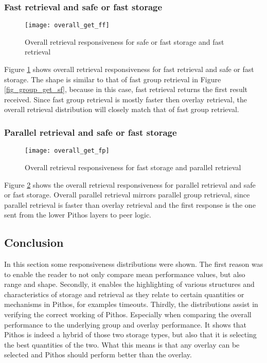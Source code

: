 \subsubsection{Fast retrieval and safe or fast storage}
\begin{figure}[htbp]
 \centering
 \texttt{[image: overall\_get\_ff]}
 \caption{Overall retrieval responsiveness for safe or fast storage and fast retrieval}
 \label{fig_overall_get_ff}
\end{figure}
%
Figure \ref{fig_overall_get_ff} shows overall retrieval responsiveness for fast retrieval and safe or fast storage. The shape is similar to that of fast group retrieval in Figure \ref{fig_group_get_sf}, because in this case, fast retrieval returns the first result received. Since fast group retrieval is mostly faster then overlay retrieval, the overall retrieval distribution will closely match that of fast group retrieval.

\subsubsection{Parallel retrieval and safe or fast storage}
\begin{figure}[htbp]
 \centering
 \texttt{[image: overall\_get\_fp]}
 \caption{Overall retrieval responsiveness for fast storage and parallel retrieval}
 \label{fig_overall_get_fp}
\end{figure}
%
Figure \ref{fig_overall_get_fp} shows the overall retrieval responsiveness for parallel retrieval and safe or fast storage. Overall parallel retrieval mirrors parallel group retrieval, since parallel retrieval is faster than overlay retrieval and the first response is the one sent from the lower Pithos layers to peer logic.

\subsection{Conclusion}

In this section some responsiveness distributions were shown. The first reason was to enable the reader to not only compare mean performance values, but also range and shape. Secondly, it enables the highlighting of various structures and characteristics of storage and retrieval as they relate to certain quantities or mechanisms in Pithos, for examples timeouts. Thirdly, the distributions assist in verifying the correct working of Pithos. Especially when comparing the overall performance to the underlying group and overlay performance. It shows that Pithos is indeed a hybrid of those two storage types, but also that it is selecting the best quantities of the two. What this means is that any overlay can be selected and Pithos should perform better than the overlay.

